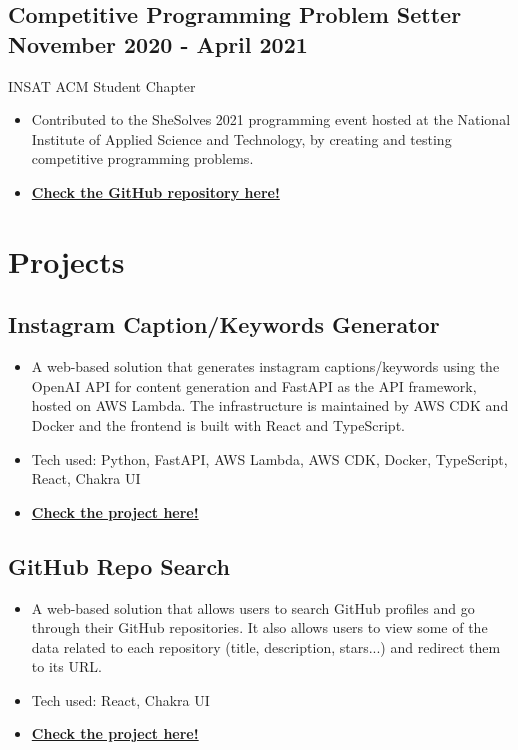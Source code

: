 \documentclass[a4,10pt]{article}
\newcommand{\subtext}[1]{
#1\par\vspace{-0.2cm}}
\newenvironment{zitemize}{
\begin{itemize}\itemsep0pt \parskip0pt \parsep1pt}
{\end{itemize}\vspace{-0.5cm}}
\begin{document}
\subsection*{Competitive Programming Problem Setter \hfill November 2020 - April 2021} 
\subtext{INSAT ACM Student Chapter \hfill } 
    \begin{zitemize}
        \item  Contributed to the SheSolves 2021 programming event hosted at the National Institute of Applied Science and Technology, by creating and testing competitive programming problems.
         \item \href{https://github.com/sirajeddineaissa/SheSolves2021-INSAT}{\small \textbf {Check the GitHub repository here!}}
    \end{zitemize}
  


\section{Projects} 

\subsection*{Instagram Caption/Keywords Generator {\normalsize\normalfont} \hfill} 
    \begin{zitemize}
        \item A web-based solution that generates instagram captions/keywords using the OpenAI API for content generation and FastAPI as the API framework, hosted on AWS Lambda. The infrastructure is maintained by AWS CDK and Docker and the frontend is built with React and TypeScript.
        \item Tech used: Python, FastAPI, AWS Lambda, AWS CDK, Docker, TypeScript, React, Chakra UI
         \item \href{https://aws-openai-instagram-gen.vercel.app}{\small \textbf {Check the project here!}}
    \end{zitemize}
    
\subsection*{GitHub Repo Search {\normalsize\normalfont} \hfill} 
    \begin{zitemize}
        \item A web-based solution that allows users to search GitHub profiles and go through their GitHub repositories. It also allows users to view some of the data related to each repository (title, description, stars...) and redirect them to its URL.
        \item Tech used: React, Chakra UI
         \item \href{https://mvst-project.netlify.app}{\small \textbf {Check the project here!}}
    \end{zitemize}
\end{document}
